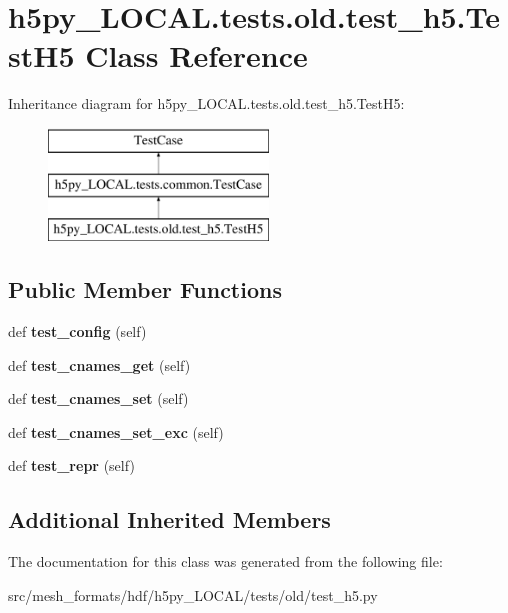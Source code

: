 \hypertarget{classh5py__LOCAL_1_1tests_1_1old_1_1test__h5_1_1TestH5}{}\section{h5py\+\_\+\+L\+O\+C\+A\+L.\+tests.\+old.\+test\+\_\+h5.\+Test\+H5 Class Reference}
\label{classh5py__LOCAL_1_1tests_1_1old_1_1test__h5_1_1TestH5}
Inheritance diagram for h5py\+\_\+\+L\+O\+C\+A\+L.\+tests.\+old.\+test\+\_\+h5.\+Test\+H5\+:\begin{figure}[H]
\begin{center}
\leavevmode
\includegraphics[height=3.000000cm]{classh5py__LOCAL_1_1tests_1_1old_1_1test__h5_1_1TestH5}
\end{center}
\end{figure}
\subsection*{Public Member Functions}
\begin{DoxyCompactItemize}
\item 
\mbox{\label{classh5py__LOCAL_1_1tests_1_1old_1_1test__h5_1_1TestH5_a81c057890b7b4be9a286ec80ece2a12a}} 
def {\bfseries test\+\_\+config} (self)
\item 
\mbox{\label{classh5py__LOCAL_1_1tests_1_1old_1_1test__h5_1_1TestH5_aa0a937a789e853bc22b51dfca9d745e3}} 
def {\bfseries test\+\_\+cnames\+\_\+get} (self)
\item 
\mbox{\label{classh5py__LOCAL_1_1tests_1_1old_1_1test__h5_1_1TestH5_af928af2e0903b60622f5607ada81fe2b}} 
def {\bfseries test\+\_\+cnames\+\_\+set} (self)
\item 
\mbox{\label{classh5py__LOCAL_1_1tests_1_1old_1_1test__h5_1_1TestH5_ac36ca21e2840534848c2186470651f4b}} 
def {\bfseries test\+\_\+cnames\+\_\+set\+\_\+exc} (self)
\item 
\mbox{\label{classh5py__LOCAL_1_1tests_1_1old_1_1test__h5_1_1TestH5_a2bdde987fbb8e032328c08ae6a347f0b}} 
def {\bfseries test\+\_\+repr} (self)
\end{DoxyCompactItemize}
\subsection*{Additional Inherited Members}


The documentation for this class was generated from the following file\+:\begin{DoxyCompactItemize}
\item 
src/mesh\+\_\+formats/hdf/h5py\+\_\+\+L\+O\+C\+A\+L/tests/old/test\+\_\+h5.\+py\end{DoxyCompactItemize}
